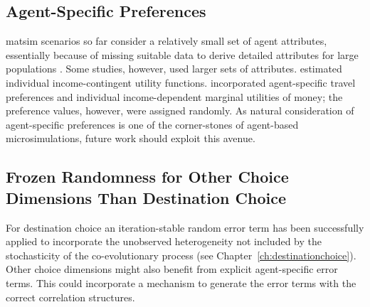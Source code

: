 \subsection{Agent-Specific Preferences}
\label{sec:agent-specific-prefs}
\gls{matsim} scenarios so far consider a relatively small set of agent attributes, essentially because of missing suitable data to derive detailed attributes for large populations \citep[][]{MuellerFloetteroed_unpub_hEART_2014}. 
Some studies, however, used larger sets of attributes. 
\citet{GretherEtAl2010TrbIncomeInTRR, KickhoeferEtAl2011PolicyEvaluationIncome} estimated individual income-contingent utility functions. 
\citet[][]{HorniEtAl_TechRep_IVT_2012_a, HorniAxhausen_TechRep_IVT_2014} incorporated agent-specific travel preferences and individual income-dependent marginal utilities of money; the preference values, however, were assigned randomly. 
As natural consideration of agent-specific preferences is one of the corner-stones of agent-based \glspl{microsimulation}, future work should exploit this avenue. 


\subsection{Frozen Randomness for Other Choice Dimensions Than Destination Choice}
\label{sec:future-frozen-randomness}

For destination choice an iteration-stable random error term has been successfully applied to incorporate the unobserved heterogeneity not included by the stochasticity of the co-evolutionary process (see Chapter~\ref{ch:destinationchoice}). Other choice dimensions
might also benefit from explicit agent-specific error terms.  
This 
could incorporate a mechanism to generate the error terms with the correct correlation structures. 


